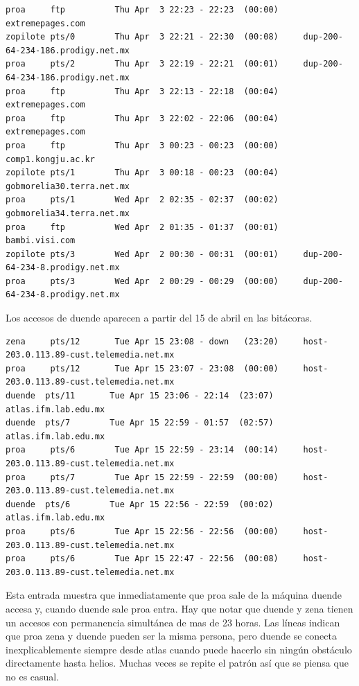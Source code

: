 \begin{lstlisting}[style=terminal]
proa     ftp          Thu Apr  3 22:23 - 22:23  (00:00)     extremepages.com
zopilote pts/0        Thu Apr  3 22:21 - 22:30  (00:08)     dup-200-64-234-186.prodigy.net.mx
proa     pts/2        Thu Apr  3 22:19 - 22:21  (00:01)     dup-200-64-234-186.prodigy.net.mx
proa     ftp          Thu Apr  3 22:13 - 22:18  (00:04)     extremepages.com
proa     ftp          Thu Apr  3 22:02 - 22:06  (00:04)     extremepages.com
proa     ftp          Thu Apr  3 00:23 - 00:23  (00:00)     comp1.kongju.ac.kr
zopilote pts/1        Thu Apr  3 00:18 - 00:23  (00:04)     gobmorelia30.terra.net.mx
proa     pts/1        Wed Apr  2 02:35 - 02:37  (00:02)     gobmorelia34.terra.net.mx
proa     ftp          Wed Apr  2 01:35 - 01:37  (00:01)     bambi.visi.com
zopilote pts/3        Wed Apr  2 00:30 - 00:31  (00:01)     dup-200-64-234-8.prodigy.net.mx
proa     pts/3        Wed Apr  2 00:29 - 00:29  (00:00)     dup-200-64-234-8.prodigy.net.mx
\end{lstlisting}

\vspace{1em}

 Los accesos de duende aparecen a partir del 15 de abril en las bitácoras. 

\vspace{1em}

\begin{lstlisting}[style=terminal]
zena     pts/12       Tue Apr 15 23:08 - down   (23:20)     host-203.0.113.89-cust.telemedia.net.mx
proa     pts/12       Tue Apr 15 23:07 - 23:08  (00:00)     host-203.0.113.89-cust.telemedia.net.mx
duende  pts/11       Tue Apr 15 23:06 - 22:14  (23:07)     atlas.ifm.lab.edu.mx
duende  pts/7        Tue Apr 15 22:59 - 01:57  (02:57)     atlas.ifm.lab.edu.mx
proa     pts/6        Tue Apr 15 22:59 - 23:14  (00:14)     host-203.0.113.89-cust.telemedia.net.mx
proa     pts/7        Tue Apr 15 22:59 - 22:59  (00:00)     host-203.0.113.89-cust.telemedia.net.mx
duende  pts/6        Tue Apr 15 22:56 - 22:59  (00:02)     atlas.ifm.lab.edu.mx
proa     pts/6        Tue Apr 15 22:56 - 22:56  (00:00)     host-203.0.113.89-cust.telemedia.net.mx
proa     pts/6        Tue Apr 15 22:47 - 22:56  (00:08)     host-203.0.113.89-cust.telemedia.net.mx
\end{lstlisting}

\vspace{1em}

Esta entrada muestra que inmediatamente que proa sale de la máquina
duende accesa y, cuando duende sale proa entra. Hay que notar que
duende y zena tienen un accesos con permanencia simultánea de mas de
23 horas. Las líneas indican que proa zena y duende pueden ser la misma
persona, pero duende se conecta inexplicablemente siempre desde
atlas cuando puede hacerlo sin ningún obstáculo directamente hasta
helios. Muchas veces se repite el patrón así que se piensa que no
es casual.

